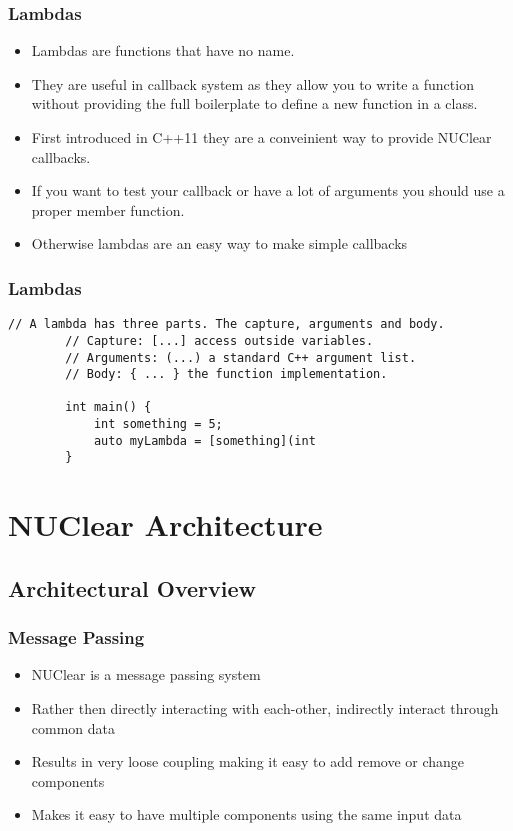 \documentclass{beamer}
\begin{document}
\begin{frame}
	\frametitle{Lambdas}
	\begin{itemize}
		\item Lambdas are functions that have no name. 
		\item They are useful in callback system as they allow you to write a function without providing the full boilerplate
			to define a new function in a class.
		\item First introduced in C++11 they are a conveinient way to provide NUClear callbacks.
		\item If you want to test your callback or have a lot of arguments you should use a proper member function.
		\item Otherwise lambdas are an easy way to make simple callbacks
	\end{itemize}
\end{frame}

\begin{frame}[fragile]
	\frametitle{Lambdas}
	\begin{lstlisting}[language=nuclear]
		// A lambda has three parts. The capture, arguments and body.
		// Capture: [...] access outside variables.
		// Arguments: (...) a standard C++ argument list.
		// Body: { ... } the function implementation.

		int main() {
		    int something = 5;
		    auto myLambda = [something](int
		}
	\end{lstlisting}
\end{frame}


\section{NUClear Architecture}
\subsection{Architectural Overview}
\begin{frame}
	\frametitle{Message Passing}
	\begin{itemize}
		\item NUClear is a message passing system
		\item Rather then directly interacting with each-other, indirectly interact through common data
		\item Results in very loose coupling making it easy to add remove or change components
		\item Makes it easy to have multiple components using the same input data
	\end{itemize}
\end{frame}
\end{document}
